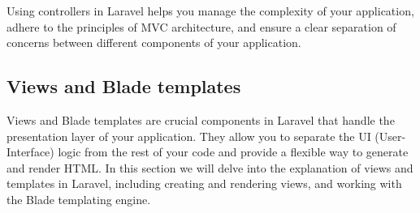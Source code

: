 \medskip Using controllers in Laravel helps you manage the complexity of your application, adhere to the principles of MVC architecture, and ensure a clear separation of concerns between different components of your application.
\subsection{Views and Blade templates}
   
Views and Blade templates are crucial components in Laravel that handle the presentation layer of your application. They allow you to separate the UI (User-Interface) logic from the rest of your code and provide a flexible way to generate and render HTML. In this section we will delve into the explanation of views and templates in Laravel, including creating and rendering views, and working with the Blade templating engine.
